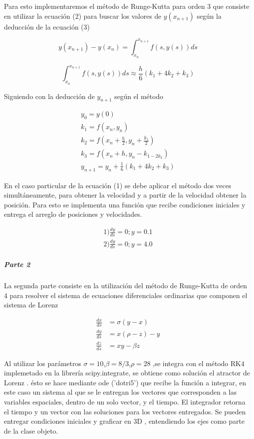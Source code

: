 \documentclass[prl,showpacs, twocolumn]{revtex4-1}
\begin{document}
Para esto implementaremos el m\'etodo de Runge-Kutta para orden $3$ que consiste en utilizar la ecuaci\'on (2) para buscar los valores de $y(x_{n+1})$ seg\'un la deducci\'on de la ecuaci\'on (3)

\begin{equation}
y(x_{n+1}) - y(x_n) = \int_{x_n}^{x_{n+1}} f(s,y(s)) ds
\end{equation}

\begin{equation}
\int_{x_n}^{x_{n+1}} f(s,y(s)) ds \approx  \frac{h}{6} (k_{1} + 4k_{2} +k_{3})\end{equation}

Siguiendo con la deducci\'on de $y_{n+1}$ seg\'un el m\'etodo

\begin{eqnarray}
y_{0}= y(0)\\
k_{1}= f(x_{n},y_{n})\\
k_{2}= f(x_{n}+\frac{h}{2}, y_{n} +\frac{k_{1}}{2} )\\
k_{3}=f(x_{n}+h,y_{n}-k_{1-2k_{2}} )\\
y_{n+1}=y_{n} + \frac{1}{6} (k_{1} + 4k_{2} +k_{3})
\end{eqnarray}

En el caso particular de la ecuaci\'on (1) se debe aplicar el m\'etodo dos veces simult\'aneamente, para obtener la velocidad y a partir de la velocidad obtener la posici\'on. Para esto se implementa una funci\'on que recibe condiciones iniciales y entrega el arreglo de posiciones y velocidades. 

\begin{eqnarray}
1) \frac{dy}{ds} = 0; y = 0.1\\
 2) \frac{dy}{ds} = 0; y = 4.0
\end{eqnarray}

\subparagraph{Parte 2 }
La segunda parte consiste en la utilizaci\'on del m\'etodo de Runge-Kutta de orden 4 para resolver el sistema de ecuaciones diferenciales ordinarias que componen el sistema de Lorenz

\begin{eqnarray}
 \frac{dx}{ds} &= \sigma (y - x)\\
 \frac{dy}{ds} &= x (\rho - z) - y\\ 
 \frac{dz}{ds} &= xy - \beta z 
\end{eqnarray}

Al utilizar los par\'ametros $\sigma=10 $,$\beta= 8/3$,$\rho=28$ ,se integra con el m\'etodo RK4 implemetado en la librer\'ia scipy.integrate, se obtiene como soluci\'on el atractor de Lorenz . \'esto se hace mediante ode ('dotri5') que recibe la funci\'on a integrar, en este caso un sistema al que se le entregan los vectores que corresponden a las variables espaciales, dentro de un solo vector, y el tiempo. El integrador retorna el tiempo y un vector con las soluciones para los vectores entregados. Se pueden entregar condiciones iniciales y graficar en 3D , entendiendo los ejes como parte de la clase objeto.
\end{document}
